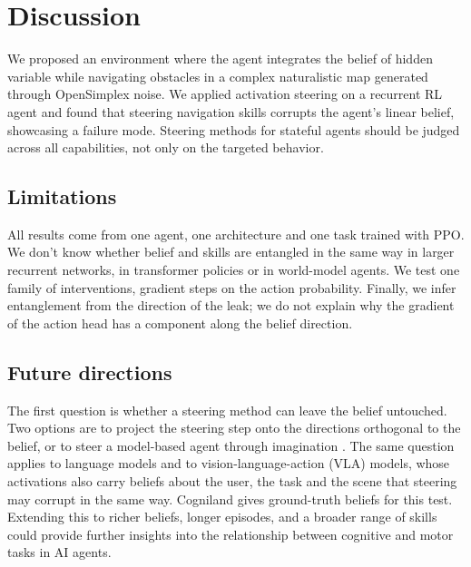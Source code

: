\section{Discussion}
We proposed an environment where the agent integrates the belief of hidden variable while navigating obstacles in a complex naturalistic map generated through OpenSimplex noise. We applied activation steering on a recurrent RL agent and found that steering navigation skills corrupts the agent's linear belief, showcasing a failure mode. Steering methods for stateful agents should be judged across all capabilities, not only on the targeted behavior.

\subsection{Limitations}
All results come from one agent, one architecture and one task trained with PPO. We don't know whether belief and skills are entangled in the same way in larger recurrent networks, in transformer policies or in world-model agents.
We test one family of interventions, gradient steps on the action probability. Finally, we infer
entanglement from the direction of the leak; we do not explain why the gradient of the action head has a component along the belief direction.

\subsection{Future directions}
The first question is whether a steering method can leave the belief untouched. Two options are to project the steering step onto the directions orthogonal to the belief, or to steer a model-based agent through imagination \citep{hafner2023dreamerv3}. The same question applies to language models and to vision-language-action (VLA) models, whose activations also carry beliefs about the user, the task and the scene that steering may corrupt in the same way. Cogniland gives ground-truth beliefs for this test. Extending
this to richer beliefs, longer episodes, and a broader range of skills could provide further insights into the relationship between cognitive and motor tasks in AI agents.
